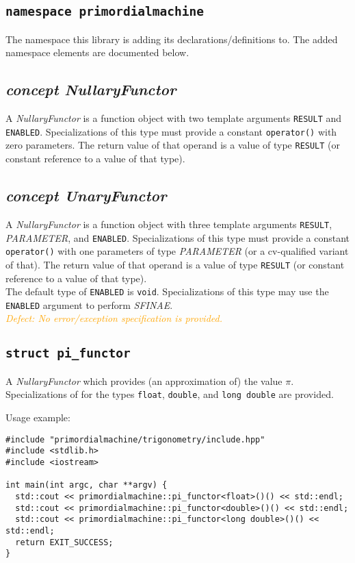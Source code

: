 \documentclass[oneside]{article}
\begin{document}
\subsection{\texttt{namespace primordialmachine}}
The namespace this library is adding its declarations/definitions to.
The added namespace elements are documented below.

\subsection{\textit{concept NullaryFunctor}}
A \textit{NullaryFunctor} is a function object with two template arguments \texttt{RESULT} and
\texttt{ENABLED}. Specializations of this type must provide a constant \verb+operator()+ with
zero parameters. The return value of that operand is a value of type \texttt{RESULT} (or constant
reference to a value of that type).\\

\subsection{\textit{concept UnaryFunctor}}
A \textit{NullaryFunctor} is a function object with three template arguments \texttt{RESULT},
\textit{PARAMETER}, and \texttt{ENABLED}. Specializations of this type must provide a constant
\verb+operator()+ with one parameters of type \textit{PARAMETER} (or a cv-qualified variant of
that). The return value of that operand is a value of type \texttt{RESULT} (or constant
reference to a value of that type).\\

\noindent{}The default type of \verb+ENABLED+ is \verb+void+. Specializations of this type may use
the \verb+ENABLED+ argument to perform \textit{SFINAE}.\\

\noindent{}\textcolor{orange}{\textit{Defect: No error/exception specification is provided.}}

\subsection{\texttt{struct pi\_functor}}
A \textit{NullaryFunctor} which provides (an approximation of) the value $\pi$.
Specializations of for the types \texttt{float}, \texttt{double}, and \texttt{long double} are provided.

\noindent{}Usage example:
\begin{verbatim}
#include "primordialmachine/trigonometry/include.hpp"
#include <stdlib.h>
#include <iostream>

int main(int argc, char **argv) {
  std::cout << primordialmachine::pi_functor<float>()() << std::endl;
  std::cout << primordialmachine::pi_functor<double>()() << std::endl;
  std::cout << primordialmachine::pi_functor<long double>()() << std::endl;  
  return EXIT_SUCCESS;
}
\end{verbatim}
\end{document}
